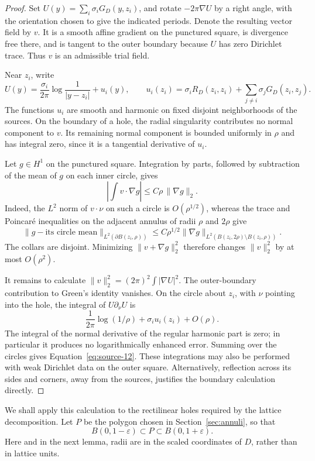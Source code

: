 \begin{proof}
Set \(U(y)=\sum_i\sigma_iG_D(y,z_i)\), and rotate
\(-2\pi\nabla U\) by a right angle, with the orientation chosen to give
the indicated periods.  Denote the resulting vector field by \(v\).
It is a smooth affine gradient on the punctured square, is divergence
free there, and is tangent to the outer boundary because \(U\) has
zero Dirichlet trace.  Thus \(v\) is an admissible trial field.

Near \(z_i\), write
\[
 U(y)=\frac{\sigma_i}{2\pi}\log\frac1{|y-z_i|}+u_i(y),
 \qquad
 u_i(z_i)=\sigma_iR_D(z_i,z_i)
                 +\sum_{j\ne i}\sigma_jG_D(z_i,z_j).
\]
The functions \(u_i\) are smooth and harmonic on fixed disjoint
neighborhoods of the sources.  On the boundary of a hole, the radial
singularity contributes no normal component to \(v\).  Its remaining
normal component is bounded uniformly in \(\rho\) and has integral
zero, since it is a tangential derivative of \(u_i\).

Let \(g\in H^1\) on the punctured square.  Integration by parts,
followed by subtraction of the mean of \(g\) on each inner circle,
gives
\[
 \left|\int v\cdot\nabla g\right|
 \leq C\rho\,\|\nabla g\|_2.
\]
Indeed, the \(L^2\) norm of \(v\cdot\nu\) on such a circle is
\(O(\rho^{1/2})\), whereas the trace and Poincar\'e inequalities on
the adjacent annulus of radii \(\rho\) and \(2\rho\) give
\[
 \|g-\text{its circle mean}\|_{L^2(\partial B(z_i,\rho))}
 \leq C\rho^{1/2}
        \|\nabla g\|_{L^2(B(z_i,2\rho)\setminus B(z_i,\rho))}.
\]
The collars are disjoint.  Minimizing
\(\|v+\nabla g\|_2^2\) therefore changes \(\|v\|_2^2\)
by at most \(O(\rho^2)\).

It remains to calculate
\(\|v\|_2^2=(2\pi)^2\int|\nabla U|^2\).
The outer-boundary contribution to Green's identity vanishes.
On the circle about \(z_i\), with \(\nu\) pointing into the hole,
the integral of \(U\partial_\nu U\) is
\[
 \frac1{2\pi}\log(1/\rho)+\sigma_i u_i(z_i)+O(\rho).
\]
The integral of the normal derivative of the regular harmonic part
is zero; in particular it produces no logarithmically enhanced
error.  Summing over the circles gives
Equation~\eqref{eq:source-12}.  These integrations may also be
performed with weak Dirichlet data on the outer square.  Alternatively,
reflection across its sides and corners, away from the sources,
justifies the boundary calculation directly.
\end{proof}

We shall apply this calculation to the rectilinear holes required by
the lattice decomposition.  Let \(P\) be the polygon chosen in
Section~\ref{sec:annuli}, so that
\[
 B(0,1-\varepsilon)\subset P\subset B(0,1+\varepsilon).
\]
Here and in the next lemma, radii are in the scaled coordinates of
\(D\), rather than in lattice units.

